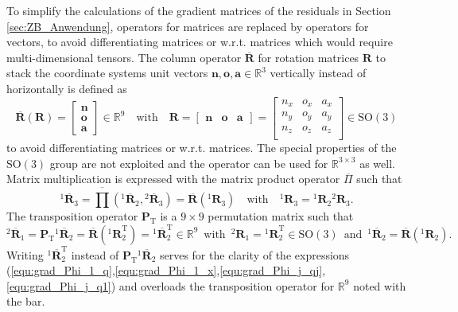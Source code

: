 \documentclass[robotics,article,accept,moreauthors,pdftex]{Definitions/mdpi}
\newcommand{\bm}[1]{\boldsymbol{#1}}
\newcommand{\rotmat}[2]{{{ }^{#1}\boldsymbol{R}}_{#2}}
\newcommand{\rotmato}[2]{{{ }^{#1}\boldsymbol{\overline{R}}}_{#2}}
\newcommand{\transp}[0]{{\mathrm{T}}}
\begin{document}
To simplify the calculations of the gradient matrices of the residuals in Section\,\ref{sec:ZB_Anwendung}, operators for matrices are replaced by operators for vectors, to avoid differentiating matrices or w.r.t. matrices which would require multi-dimensional tensors.
The column operator $\overline{\bm{R}}$ for rotation matrices $\bm{R}$ to stack the coordinate systems unit vectors $\bm{n},\bm{o},\bm{a} \in {\mathbb{R}}^{3}$ vertically instead of horizontally is defined as
%
\begin{equation}
\overline{\bm{R}}(\bm{R})=\begin{bmatrix}
\bm{n} \\ \bm{o} \\ \bm{a}
\end{bmatrix} \in {\mathbb{R}}^{9}
\quad
\mathrm{with}
\quad
\bm{R}=\begin{bmatrix}
\bm{n} & \bm{o} & \bm{a}
\end{bmatrix}
=
\begin{bmatrix}
{n_x}&{o_x}&{a_x} \\
{n_y}&{o_y}&{a_y} \\ 
{n_z}&{o_z}&{a_z} \\ 
\end{bmatrix}
\in \mathrm{SO}(3)
\label{equ:def_rotmat}
\end{equation}
%
to avoid differentiating matrices or w.r.t. matrices.
The special properties of the $\mathrm{SO}(3)$ group are not exploited and the operator can be used for ${\mathbb{R}}^{3\times3}$ as well.
Matrix multiplication is expressed with the matrix product operator $\overline{\Pi}$
%
such that
%
\begin{equation}
\rotmato{1}{3}
=
\overline{\prod}\left( \rotmato{1}{2}, \rotmato{2}{3}\right)
=
\overline{\bm{R}}(\rotmat{1}{3})
\quad
\mathrm{with}
\quad
\rotmat{1}{3}
=
\rotmat{1}{2}
\rotmat{2}{3}.
\label{equ:matprod}
\end{equation}
%
The transposition operator $\bm{P}_\transp$ is a $9 \times 9$ permutation matrix such that
%
\begin{equation}
\rotmato{2}{1}
=
\bm{P}_\transp \rotmato{1}{2}
=
\overline{\bm{R}}(\rotmat{1}{2}^\transp)
=
\rotmato{1}{2}^\transp
\in {\mathbb{R}}^{9}
\enspace
\mathrm{with}
\enspace
\rotmat{2}{1}
=
\rotmat{1}{2}^\transp
\in \mathrm{SO}(3)
\enspace
\mathrm{and}
\enspace
\rotmato{1}{2}=\overline{\bm{R}}(\rotmat{1}{2})
.
\label{equ:transposition_operator}
\end{equation}
%
Writing $\rotmato{1}{2}^\transp$ instead of $\bm{P}_\transp \rotmato{1}{2}$ serves for the clarity of the expressions (\ref{equ:grad_Phi_1_q},\ref{equ:grad_Phi_1_x},\ref{equ:grad_Phi_j_qj},\ref{equ:grad_Phi_j_q1}) and overloads the transposition operator for ${\mathbb{R}}^{9}$ noted with the bar.
\end{document}
